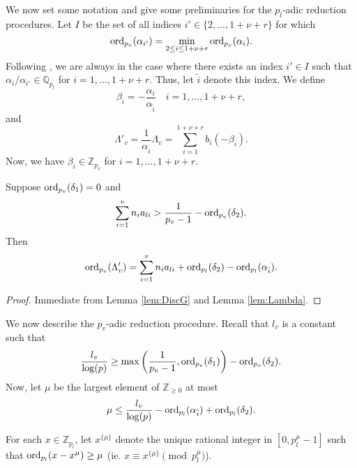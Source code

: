 We now set some notation and give some preliminaries for the $p_l$-adic reduction procedures. Let $I$ be the set of all indices $i' \in \{2, \dots, 1+ \nu + r\}$ for which
\[\operatorname{ord}_{p_v}(\alpha_{i'}) = \min_{2\leq i\leq 1+ \nu+ r} \operatorname{ord}_{p_v}(\alpha_i).\]
Following \cite{Ham}, we are always in the case where there exists an index $i' \in I$ such that $\alpha_i/\alpha_{i'} \in \mathbb{Q}_{p_l}$ for $i = 1, \dots, 1+ \nu+ r$. Thus, let $\hat{i}$ denote this index. We define
\[\beta_i = - \frac{\alpha_i}{\alpha_{\hat{i}}} \quad i = 1, \dots, 1+ \nu+ r,\]
and 
\[\Lambda'_v = \frac{1}{\alpha_{\hat{i}}}\Lambda_v = \sum_{i = 1}^{1+ \nu+ r} b_i(-\beta_i).\]
Now, we have $\beta_i \in \mathbb{Z}_{p_v}$ for $i = 1, \dots, 1+ \nu+ r$. 

\begin{lemma} \label{Lem:19.1}
Suppose $\operatorname{ord}_{p_v}(\delta_1) = 0$ and 
\[\sum_{i = 1}^v n_{i}a_{li} > \frac{1}{p_v-1} - \operatorname{ord}_{p_v}(\delta_2).\]
Then
\[\operatorname{ord}_{p_v}(\Lambda_v') = \sum_{i = 1}^v n_{i}a_{li} + \operatorname{ord}_{p_l}(\delta_2) - \operatorname{ord}_{p_l}(\alpha_{\hat{i}}).\]
\end{lemma}

\begin{proof}
Immediate from Lemma \ref{lem:DiscG} and Lemma \ref{lem:Lambda}. 
\end{proof}

We now describe the $p_v$-adic reduction procedure. Recall that $l_v$ is a constant such that
\[\frac{l_v}{\log(p)} \geq \max\left( \frac{1}{p_v-1}, \operatorname{ord}_{p_v}(\delta_1)\right) - \operatorname{ord}_{p_v}(\delta_2).\]
Now, let $\mu$ be the largest element of $\mathbb{Z}_{\geq 0}$ at most
\[\mu \leq \frac{l_v}{\log(p)} - \operatorname{ord}_{p_l}(\alpha_{\hat{i}}) + \operatorname{ord}_{p_l}(\delta_2).\]

For each $x \in \mathbb{Z}_{p_l}$, let $x^{\{\mu\}}$ denote the unique rational integer in $[0,p_l^{\mu} - 1]$ such that $\operatorname{ord}_{p_l}(x - x^{\mu}) \geq \mu$ (ie. $x \equiv x^{\{\mu\}} \pmod{p_l^{\mu}}$). 

